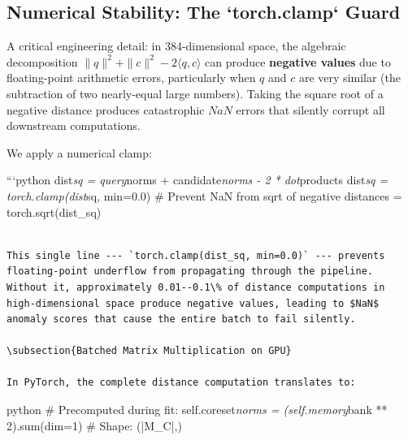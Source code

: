 \documentclass[12pt,a4paper,oneside]{report}
\begin{document}
\subsection{Numerical Stability: The `torch.clamp` Guard}

A critical engineering detail: in 384-dimensional space, the algebraic decomposition $\|q\|^2 + \|c\|^2 - 2\langle q, c \rangle$ can produce \textbf{negative values} due to floating-point arithmetic errors, particularly when $q$ and $c$ are very similar (the subtraction of two nearly-equal large numbers). Taking the square root of a negative distance produces catastrophic $NaN$ errors that silently corrupt all downstream computations.

We apply a numerical clamp:

```python
dist\textit{sq = query}norms + candidate\textit{norms - 2 * dot}products
dist\textit{sq = torch.clamp(dist}sq, min=0.0)  # Prevent NaN from sqrt of negative
distances = torch.sqrt(dist_sq)
\begin{verbatim}

This single line --- `torch.clamp(dist_sq, min=0.0)` --- prevents floating-point underflow from propagating through the pipeline. Without it, approximately 0.01--0.1\% of distance computations in high-dimensional space produce negative values, leading to $NaN$ anomaly scores that cause the entire batch to fail silently.

\subsection{Batched Matrix Multiplication on GPU}

In PyTorch, the complete distance computation translates to:

\end{verbatim}python
# Precomputed during fit:
self.coreset\textit{norms = (self.memory}bank ** 2).sum(dim=1)  # Shape: (|M_C|,)
\end{document}
